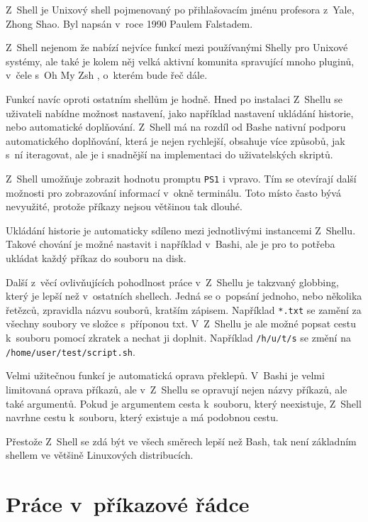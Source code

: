 \documentclass[thesis=M,czech]{FITthesis}[2012/06/26]
\begin{document}
Z~Shell \cite{zsh} je Unixový shell pojmenovaný po přihlašovacím jménu profesora z~Yale, Zhong Shao. Byl napsán v~roce 1990 Paulem Falstadem.

Z~Shell nejenom že nabízí nejvíce funkcí mezi používanými Shelly pro Unixové systémy, ale také je kolem něj velká aktivní komunita spravující mnoho pluginů, v~čele s~Oh My Zsh \cite{ohmyzsh}, o~kterém bude řeč dále.

Funkcí navíc oproti ostatním shellům je hodně. Hned po instalaci Z~Shellu se uživateli nabídne možnost nastavení, jako například nastavení ukládání historie, nebo automatické doplňování. Z~Shell má na rozdíl od Bashe nativní podporu automatického doplňování, která je nejen rychlejší, obsahuje více způsobů, jak s~ní iteragovat, ale je i snadnější na implementaci do uživatelských skriptů.

Z~Shell umožňuje zobrazit hodnotu promptu \texttt{PS1} i vpravo. Tím se otevírají další možnosti pro zobrazování informací v~okně terminálu. Toto místo často bývá nevyužité, protože příkazy nejsou většinou tak dlouhé.

Ukládání historie je automaticky sdíleno mezi jednotlivými instancemi Z~Shellu. Takové chování je možné nastavit i například v~Bashi, ale je pro to potřeba ukládat každý příkaz do souboru na disk.

Další z~věcí ovlivňujících pohodlnost práce v~Z~Shellu je takzvaný globbing, který je lepší než v~ostatních shellech. Jedná se o~popsání jednoho, nebo několika řetězců, zpravidla názvu souborů, kratším zápisem. Například \texttt{*.txt} se zamění za všechny soubory ve složce s~příponou txt. V~Z~Shellu je ale možné popsat cestu k~souboru pomocí zkratek a nechat ji doplnit. Například \texttt{/h/u/t/s} se změní na \texttt{/home/user/test/script.sh}.

Velmi užitečnou funkcí je automatická oprava překlepů. V~Bashi je velmi limitovaná oprava příkazů, ale v~Z~Shellu se opravují nejen názvy příkazů, ale také argumentů. Pokud je argumentem cesta k~souboru, který neexistuje, Z~Shell navrhne cestu k~souboru, který existuje a má podobnou cestu.

Přestože Z~Shell se zdá být ve všech směrech lepší než Bash, tak není základním shellem ve většině Linuxových distribucích.


%
%
%
\section{Práce v~příkazové řádce}
\end{document}
